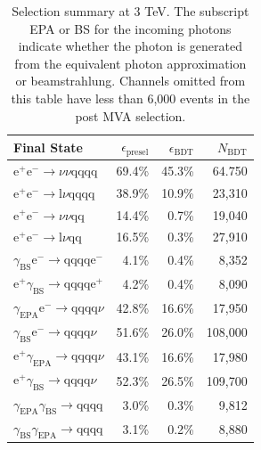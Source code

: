 \begin{table}[h!]
\centering
\begin{tabular}{ l r r r }
\hline
Final State & $\epsilon_{\text{presel}}$ & $\epsilon_{\text{BDT}}$ & $N_{\text{BDT}}$ \\ 
\hline
$\text{e}^{+}\text{e}^{-} \rightarrow \nu{\nu}\text{qqqq}$ & 69.4\% & 45.3\% & 64.750 \\
$\text{e}^{+}\text{e}^{-} \rightarrow \text{l}\nu\text{qqqq}$ & 38.9\% & 10.9\% & 23,310 \\
$\text{e}^{+}\text{e}^{-} \rightarrow \nu{\nu}\text{qq}$ & 14.4\% & 0.7\% & 19,040 \\
$\text{e}^{+}\text{e}^{-} \rightarrow \text{l}\nu\text{qq}$ & 16.5\% & 0.3\% & 27,910 \\
$\gamma_{\text{BS}}\text{e}^{-} \rightarrow \text{qqqq}\text{e}^{-}$ & 4.1\% & 0.4\% & 8,352 \\
$\text{e}^{+}\gamma_{\text{BS}} \rightarrow \text{qqqq}\text{e}^{+}$ & 4.2\% & 0.4\% & 8,090 \\
$\gamma_{\text{EPA}}\text{e}^{-} \rightarrow \text{qqqq}\nu$ & 42.8\% & 16.6\% & 17,950 \\
$\gamma_{\text{BS}}\text{e}^{-} \rightarrow \text{qqqq}\nu$ & 51.6\% & 26.0\% & 108,000 \\
$\text{e}^{+}\gamma_{\text{EPA}} \rightarrow \text{qqqq}\nu$ & 43.1\% & 16.6\% & 17,980 \\
$\text{e}^{+}\gamma_{\text{BS}} \rightarrow \text{qqqq}\nu$ & 52.3\% & 26.5\% & 109,700 \\
$\gamma_{\text{EPA}}\gamma_{\text{BS}} \rightarrow \text{qqqq}$ & 3.0\% & 0.3\% & 9,812 \\
$\gamma_{\text{BS}}\gamma_{\text{EPA}} \rightarrow \text{qqqq}$ & 3.1\% & 0.2\% & 8,880 \\
\hline
\end{tabular}
\caption[Selection summary at 3 TeV.]{Selection summary at 3 TeV.   The subscript EPA or BS for the incoming photons indicate whether the photon is generated from the equivalent photon approximation or beamstrahlung.  Channels omitted from this table have less than 6,000 events in the post MVA selection.}
\label{table:selectionsummary3000GeV}
\end{table}

















